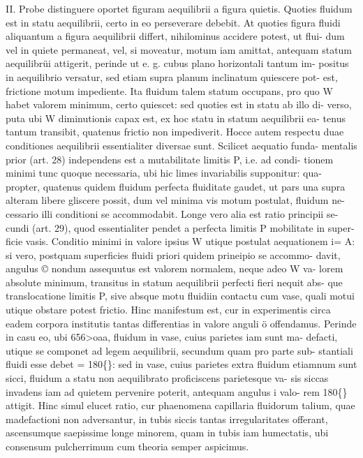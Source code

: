 \documentclass[12pt,a4paper]{article}
\begin{document}
II. Probe distinguere oportet figuram aequilibrii a figura quietis.   Quoties
fluidum est in statu aequilibrii, certo in eo perseverare debebit. At quoties figura
fluidi aliquantum a figura aequilibrii differt, nihilominus accidere potest, ut flui-
dum vel in quiete permaneat, vel, si moveatur, motum iam amittat, antequam
statum aequilibrüi attigerit, perinde ut e. g. cubus plano horizontali tantum im-
positus in aequilibrio versatur, sed etiam supra planum inclinatum quiescere pot-
est, frictione motum impediente.     Ita fluidum talem statum occupans, pro quo
W habet valorem minimum, certo quiescet: sed quoties est in statu ab illo di-
verso, puta ubi       W diminutionis capax est, ex hoc statu in statum aequilibrii ea-
tenus tantum transibit, quatenus frictio non impediverit.           Hocce autem respectu
duae conditiones aequilibrii essentialiter diversae sunt.       Scilicet aequatio funda-
mentalis prior (art. 28) independens est a mutabilitate limitis P, i.e. ad condi-
tionem minimi tunc quoque necessaria, ubi hic limes invariabilis supponitur: qua-
propter, quatenus quidem fluidum perfecta fluiditate gaudet, ut pars una supra
alteram libere gliscere possit, dum vel minima vis motum postulat, fluidum ne-
cessario illi conditioni se accommodabit.   Longe vero alia est ratio principii se-
cundi (art. 29), quod essentialiter pendet a perfecta limitis P mobilitate in super-
ficie vasis. Conditio minimi in valore ipsius W utique postulat aequationem
i= A: si vero, postquam superficies fluidi priori quidem prineipio se accommo-
davit, angulus © nondum assequutus est valorem normalem, neque adeo W va-
lorem absolute minimum, transitus in statum aequilibrii perfecti fieri nequit abs-
que translocatione limitis P, sive absque motu fluidiin contactu cum vase, quali
motui utique obstare potest frictio.  Hinc manifestum est, cur in experimentis
circa eadem corpora institutis tantas differentias in valore anguli ö offendamus.
Perinde in casu eo, ubi       656>oaa,    fluidum in vase, cuius parietes iam sunt ma-
defacti, utique se componet ad legem aequilibrii, secundum quam pro parte sub-
stantiali fluidi esse debet = 180\textdegree\{\}: sed in vase, cuius parietes extra fluidum
etiamnum sunt sicci, fluidum a statu non aequilibrato proficiscens parietesque va-
sis siccas invadens iam ad quietem pervenire poterit, antequam angulus i valo-
rem   180\textdegree\{\} attigit.     Hinc simul elucet ratio, cur phaenomena capillaria fluidorum
talium, quae madefactioni non adversantur, in tubis siccis tantas irregularitates
offerant, ascensumque saepissime longe minorem, quam in tubis iam humectatis,
ubi consensum pulcherrimum cum theoria semper aspicimus.
\end{document}
